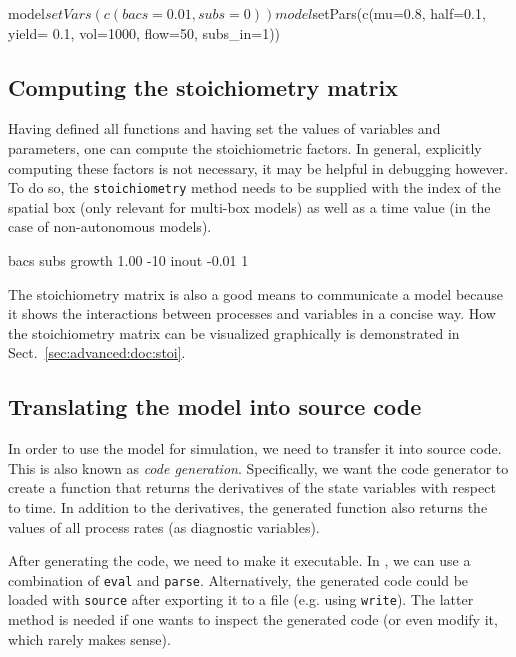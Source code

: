 \documentclass[onecolumn]{article}
\begin{document}
\begin{Schunk}
\begin{Sinput}
 model$setVars(c(bacs=0.01, subs=0))
 model$setPars(c(mu=0.8, half=0.1, yield= 0.1,
   vol=1000, flow=50, subs_in=1))
\end{Sinput}
\end{Schunk}

\subsection{Computing the stoichiometry matrix}

Having defined all functions and having set the values of variables and parameters, one can compute the stoichiometric factors. In general, explicitly computing these factors is not necessary, it may be helpful in debugging however. To do so, the \verb|stoichiometry| method needs to be supplied with the index of the spatial box (only relevant for multi-box models) as well as a time value (in the case of non-autonomous models).

\begin{Schunk}
\begin{Soutput}
        bacs subs
growth  1.00  -10
inout  -0.01    1
\end{Soutput}
\end{Schunk}

The stoichiometry matrix is also a good means to communicate a model because it shows the interactions between processes and variables in a concise way. How the stoichiometry matrix can be visualized graphically is demonstrated in Sect.~\ref{sec:advanced:doc:stoi}.

\subsection{Translating the model into source code}

In order to use the model for simulation, we need to transfer it into source code. This is also known as \emph{code generation}. Specifically, we want the code generator to create a function that returns the derivatives of the state variables with respect to time. In addition to the derivatives, the generated function also returns the values of all process rates (as diagnostic variables).

After generating the code, we need to make it executable. In , we can use a combination of \verb|eval| and \verb|parse|. Alternatively, the generated code could be loaded with \verb|source| after exporting it to a file (e.g. using \verb|write|). The latter method is needed if one wants to inspect the generated code (or even modify it, which rarely makes sense).
\end{document}
